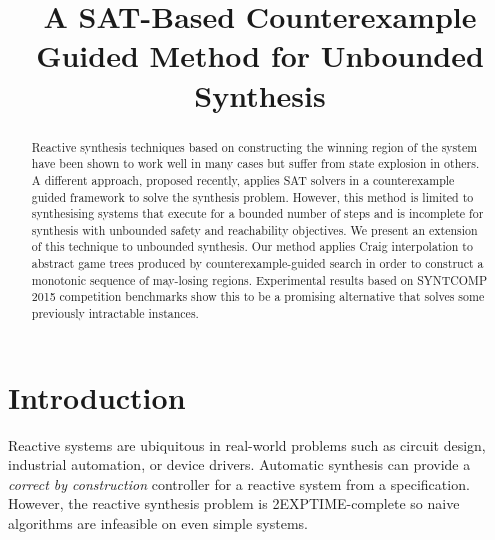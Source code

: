 \documentclass{llncs}
\begin{document}
\title{A SAT-Based Counterexample Guided Method for Unbounded Synthesis}

\author{}
\institute{}

%

\maketitle

\sloppy

\begin{abstract}

    Reactive synthesis techniques based on constructing the winning region of
    the system have been shown to work well in many cases but suffer from state
    explosion in others.  A different approach, proposed recently, applies SAT
    solvers in a counterexample guided framework to solve the synthesis
    problem.  However, this method is limited to synthesising systems that
    execute for a bounded number of steps and is incomplete for synthesis with
    unbounded safety and reachability objectives.  We present an extension of
    this technique to unbounded synthesis.  Our method applies Craig
    interpolation to abstract game trees produced by counterexample-guided
    search in order to construct a monotonic sequence of may-losing regions.
    Experimental results based on SYNTCOMP 2015 competition benchmarks show
    this to be a promising alternative that solves some previously intractable
    instances.

\end{abstract}

\section{Introduction}

Reactive systems are ubiquitous in real-world problems such as circuit design,
industrial automation, or device drivers. Automatic synthesis can provide a
\emph{correct by construction} controller for a reactive system from a
specification.  However, the reactive synthesis problem is 2EXPTIME-complete so
naive algorithms are infeasible on even simple systems.
\end{document}
